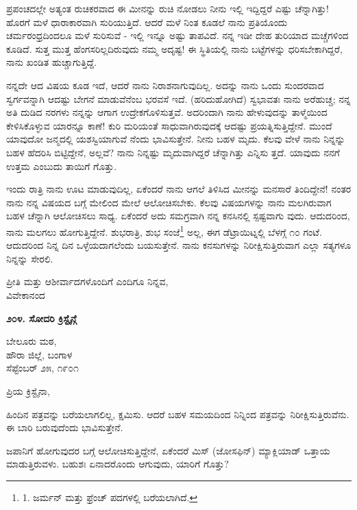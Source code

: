 ಪ್ರಪಂಚದಲ್ಲೇ ಅತ್ಯಂತ ರುಚಿಕರವಾದ ಈ ಮೀನನ್ನು ರುಚಿ ನೋಡಲು ನೀನು ಇಲ್ಲಿ ಇದ್ದಿದ್ದರೆ ಎಷ್ಟು ಚೆನ್ನಾಗಿತ್ತು! ಹೊರಗೆ ಮಳೆ ಧಾರಾಕಾರವಾಗಿ ಸುರಿಯುತ್ತಿದೆ. ಆದರೆ ಮಳೆ ನಿಂತ ಕೂಡಲೆ ನಾನು ಪ್ರತಿಯೊಂದು ಚರ್ಮರಂಧ್ರದಿಂದಲೂ ಮಳೆ ಸುರಿಸುವೆ - ಇಲ್ಲಿ ಇನ್ನೂ ಅಷ್ಟು ತಾಪವಿದೆ. ನನ್ನ ಇಡೀ ದೇಹ ತುರಿಯಾದ ಮಚ್ಚೆಗಳಿಂದ ಕೂಡಿದೆ. ಸುತ್ತ ಮುತ್ತ ಹೆಂಗಸರಿಲ್ಲದಿರುವುದು ನಮ್ಮ ಅದೃಷ್ಟ! ಈ ಸ್ಥಿತಿಯಲ್ಲಿ ನಾನು ಬಟ್ಟೆಗಳನ್ನು ಧರಿಸಬೇಕಾಗಿದ್ದರೆ, ನಾನು ಖಂಡಿತ ಹುಚ್ಚಾಗುತ್ತಿದ್ದೆ.

ನನ್ನದೇ ಆದ ವಿಷಯ ಕೂಡ ಇದೆ, ಆದರೆ ನಾನು ನಿರಾಶನಾಗುವುದಿಲ್ಲ. ಅದನ್ನು ನಾನು ಒಂದು ಸುಂದರವಾದ ಸ್ವರ್ಗವನ್ನಾಗಿ ಆದಷ್ಟು ಬೇಗನೆ ಮಾಡುವೆನೆಂಬ ಭರವಸೆ ಇದೆ. (ಹರಿದುಹೋಗಿದೆ) ಸ್ವಭಾವತಃ ನಾನು ಅರೆಹುಚ್ಚ; ನನ್ನ ಅತಿ ದುಡಿದ ನರಗಳು ನನ್ನನ್ನು ಆಗಾಗ ಉದ್ರೇಕಗೊಳಿಸುತ್ತವೆ. ಅದರಿಂದಾಗಿ ನಾನು ಹೇಳುವುದನ್ನು ತಾಳ್ಮೆಯಿಂದ ಕೇಳಿಸಿಕೊಳ್ಳುವ ಯಾರನ್ನೂ ಕಾಣೆ! ಕುರಿ ಮರಿಯಂತೆ ಸಾಧುವಾಗಿರುವುದಕ್ಕೆ ಆದಷ್ಟು ಪ್ರಯತ್ನಿಸುತ್ತಿದ್ದೇನೆ. ಮುಂದೆ ಯಾವುದೋ ಜನ್ಮದಲ್ಲಿ ಯಶಸ್ವಿಯಾಗುವೆ ನೆಂದು ಭಾವಿಸುತ್ತೇನೆ. ನೀನು ಬಹಳ ಮೃದು. ಕೆಲವು ವೇಳೆ ನಾನು ನಿನ್ನನ್ನು ಬಹಳ ಹೆದರಿಸಿ ಬಿಟ್ಟಿದ್ದೇನೆ, ಅಲ್ಲವೆ? ನಾನು ನಿನ್ನಷ್ಟು ಮೃದುವಾಗಿದ್ದರೆ ಚೆನ್ನಾಗಿತ್ತು ಎನ್ನಿಸು ತ್ತದೆ. ಯಾವುದು ನನಗೆ ಉತ್ತಮ ಎಂಬುದು ತಾಯಿಗೆ ಗೊತ್ತು.

ಇಂದು ರಾತ್ರಿ ನಾನು ಊಟ ಮಾಡುವುದಿಲ್ಲ, ಏಕೆಂದರೆ ನಾನು ಆಗಲೆ ತಿಳಿಸಿದ ಮೀನನ್ನು ಮನಸಾರೆ ತಿಂದಿದ್ದೇನೆ! ನಂತರ ನಾನು ನನ್ನ ವಿಷಯದ ಬಗ್ಗೆ ಮೇಲಿಂದ ಮೇಲೆ ಆಲೋಚಿಸಬೇಕು. ಕೆಲವು ವಿಷಯಗಳನ್ನು ನಾನು ಮಲಗಿರುವಾಗ ಬಹಳ ಚೆನ್ನಾಗಿ ಆಲೋಚಿಸಲು ಸಾಧ್ಯ. ಏಕೆಂದರೆ ಅದು ಸಮಗ್ರವಾಗಿ ನನ್ನ ಕನಸಿನಲ್ಲಿ ಸ್ಪಷ್ಟವಾಗು ವುದು. ಆದುದರಿಂದ, ನಾನು ಮಲಗಲು ಹೋಗುತ್ತಿದ್ದೇನೆ. ಶುಭರಾತ್ರಿ, ಶುಭ ಸಂಜೆ\footnote{1. ಜರ್ಮನ್ ಮತ್ತು ಫ್ರೆಂಚ್ ಪದಗಳಲ್ಲಿ ಬರೆಯಲಾಗಿದೆ.} ಅಲ್ಲ, ಈಗ ಡೆಟ್ರಾಯಿಟ್ನಲ್ಲಿ ಬೆಳಗ್ಗೆ ೧೦ ಗಂಟೆ. ಆದುದರಿಂದ ನಿನ್ನ ದಿನ ಒಳ್ಳೆಯದಾಗಲೆಂದು ಬಯಸುತ್ತೇನೆ. ನಾನು ಕನಸುಗಳನ್ನು ನಿರೀಕ್ಷಿಸುತ್ತಿರುವಾಗ ಎಲ್ಲಾ ಸತ್ಯಗಳೂ ನಿನ್ನನ್ನು ಸೇರಲಿ.

\begin{flushright}
ಪ್ರೀತಿ ಮತ್ತು ಆಶೀರ್ವಾದಗಳೊಂದಿಗೆ ಎಂದಿಗೂ ನಿನ್ನವ,\\ವಿವೇಕಾನಂದ
\end{flushright}

\begin{center}
\textbf{೨೦೪. ಸೋದರಿ ಕ್ರಿಸ್ಟೈನ್ಗೆ}
\end{center}

\begin{flushright}
ಬೇಲೂರು ಮಠ,\\ಹೌರಾ ಜಿಲ್ಲೆ, ಬಂಗಾಳ\\ಸೆಪ್ಟೆಂಬರ್ ೨೫, ೧೯೦೧
\end{flushright}

ಪ್ರಿಯ ಕ್ರಿಸ್ಟೈನಾ,

ಹಿಂದಿನ ಪತ್ರವನ್ನು ಬರೆಯಲಾಗಲಿಲ್ಲ, ಕ್ಷಮಿಸು. ಆದರೆ ಬಹಳ ಸಮಯದಿಂದ ನಿನ್ನಿಂದ ಪತ್ರವನ್ನು ನಿರೀಕ್ಷಿಸುತ್ತಿರುವೆನು. ಈ ಬಾರಿ ಬರುವುದೆಂದು ಭಾವಿಸುತ್ತೇನೆ.

ಜಪಾನಿಗೆ ಹೋಗುವುದರ ಬಗ್ಗೆ ಆಲೋಚಿಸುತ್ತಿದ್ದೇನೆ, ಏಕೆಂದರೆ ಮಿಸ್ (ಜೋಸಫಿನ್) ಮ್ಯಾಕ್ಲಿಯಾಡ್ ಒತ್ತಾಯ ಮಾಡುತ್ತಿರುವಳು. ಬಹುಶಃ ಏನಾದರೊಂದು ಆಗುವುದು, ಯಾರಿಗೆ ಗೊತ್ತು?

